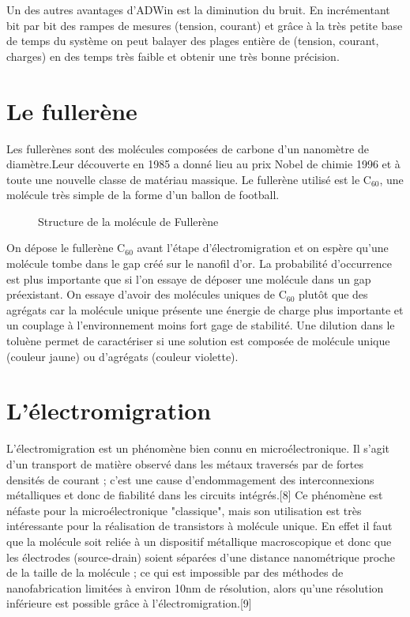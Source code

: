 Un des autres avantages d'ADWin est la diminution du bruit. En incrémentant bit par bit des rampes de mesures (tension, courant) et grâce à la très petite base de temps du système on peut balayer des plages entière de (tension, courant, charges) en des temps très faible et obtenir une très bonne précision.

\section{Le fullerène}
Les fullerènes sont des molécules composées de carbone d'un nanomètre de diamètre.Leur découverte en 1985 a donné lieu au prix Nobel de chimie 1996 et à toute une nouvelle classe de matériau massique. Le fullerène utilisé est le C$_{60}$, une molécule très simple de la forme d'un ballon de football.

\begin{figure}[h]
    \begin{center}
        \caption{Structure de la molécule de Fullerène}
        \label{fig:}
    \end{center}
\end{figure}

On dépose le fullerène C$_{60}$ avant l'étape d'électromigration et on espère qu'une molécule tombe dans le gap créé sur le nanofil d'or. La probabilité d'occurrence est plus importante que si l'on essaye de déposer une molécule dans un gap préexistant. On essaye d'avoir des molécules uniques de C$_{60}$ plutôt que des agrégats car la molécule unique présente une énergie de charge plus importante et un couplage à l'environnement moins fort gage de stabilité. Une dilution dans le toluène permet de caractériser si une solution est composée de molécule unique (couleur jaune) ou d'agrégats (couleur violette).


\section{L'électromigration}
L'électromigration est un phénomène bien connu en microélectronique. Il s'agit d'un transport de matière observé dans les métaux traversés par de fortes densités de courant ; c'est une cause d'endommagement des interconnexions métalliques et donc de fiabilité dans les circuits intégrés.[8] Ce phénomène est néfaste pour la microélectronique "classique", mais son utilisation est très intéressante pour la réalisation de transistors à molécule unique. En effet il faut que la molécule soit reliée à un dispositif métallique macroscopique et donc que les électrodes (source-drain) soient séparées d'une distance nanométrique proche de la taille de la molécule ; ce qui est impossible par des méthodes de nanofabrication limitées à environ 10nm de résolution, alors qu'une résolution inférieure est possible grâce à l'électromigration.[9]\\

